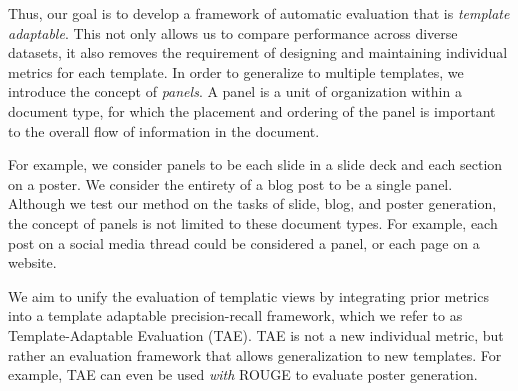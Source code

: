   Thus, our goal is to develop a framework of automatic evaluation that is \textit{template adaptable}. This not only allows us to compare performance across diverse datasets, it also removes the requirement of designing and maintaining individual metrics for each template. In order to generalize to multiple templates, we introduce the concept of \textit{panels}. A panel is a unit of organization within a document type, for which the placement and ordering of the panel is important to the overall flow of information in the document.  

For example, we consider panels to be each slide in a slide deck and each section on a poster. We consider the entirety of a blog post to be a single panel. Although we test our method on the tasks of slide, blog, and poster generation, the concept of panels is not limited to these document types. For example, each post on a social media thread could be considered a panel, or each page on a website.

We aim to unify the evaluation of templatic views by integrating prior metrics into a template adaptable precision-recall framework, which we refer to as Template-Adaptable Evaluation (TAE). TAE is not a new individual metric, but rather an evaluation framework that allows generalization to new templates. For example, TAE can even be used \textit{with} ROUGE to evaluate poster generation. 



